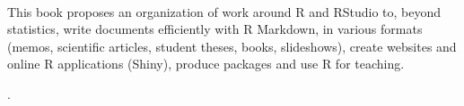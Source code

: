 \documentclass[
  12pt,
  american,
  a4paper,
  extrafontsizes,onecolumn,openright
  ]{memoir}
\makeatletter
\newcommand{\MemoirChapStyle}{daleif1}
\newcommand{\MemoirPageStyle}{Ruled}
\newlength\widthw %
\newcommand*{\SmallMargins}{
  \setlrmarginsandblock{1.5in}{1.5in}{*}
  \setmarginnotes{0.1in}{0.1in}{0.1in}
 \setulmarginsandblock{1.5in}{1in}{*}
  \checkandfixthelayout
  \ch@ngetext
  \clearpage
  \setlength{\widthw}{\textwidth+\marginparsep+\marginparwidth}
  \footnotesatfoot
  \chapterstyle{\MemoirChapStyle}  %
  \pagestyle{\MemoirPageStyle}
}
\newcommand{\evenpage}{
  \clearpage
  \strictpagecheck %
  \checkoddpage
  \ifoddpage
    \thispagestyle{empty}
    ~\\ %
    \newpage
  \else
  \fi
}
\makeatother
\begin{document}

\evenpage
\SmallMargins
\thispagestyle{empty}

\begin{normalsize}

\begin{description}

\item[Abstract]
This book proposes an organization of work around R and RStudio to, beyond statistics, write documents efficiently with R Markdown, in various formats (memos, scientific articles, student theses, books, slideshows), create websites and online R applications (Shiny), produce packages and use R for teaching.
\item[]
.
~\\

\end{description}

\end{normalsize}
\end{document}
